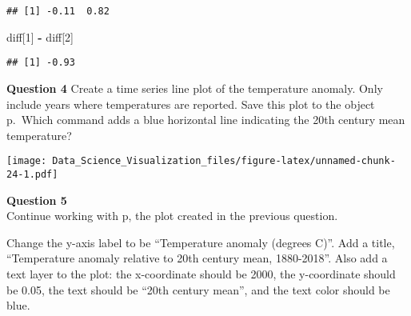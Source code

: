 \documentclass[]{article}
\newenvironment{Shaded}{\begin{snugshade}}{\end{snugshade}}
\newcommand{\DataTypeTok}[1]{\textcolor[rgb]{0.13,0.29,0.53}{#1}}
\newcommand{\DecValTok}[1]{\textcolor[rgb]{0.00,0.00,0.81}{#1}}
\newcommand{\KeywordTok}[1]{\textcolor[rgb]{0.13,0.29,0.53}{\textbf{#1}}}
\newcommand{\NormalTok}[1]{#1}
\newcommand{\OperatorTok}[1]{\textcolor[rgb]{0.81,0.36,0.00}{\textbf{#1}}}
\newcommand{\StringTok}[1]{\textcolor[rgb]{0.31,0.60,0.02}{#1}}
\begin{document}
\begin{verbatim}
## [1] -0.11  0.82
\end{verbatim}

\begin{Shaded}
\begin{Highlighting}[]
\NormalTok{diff[}\DecValTok{1}\NormalTok{] }\OperatorTok{-}\StringTok{ }\NormalTok{diff[}\DecValTok{2}\NormalTok{]}
\end{Highlighting}
\end{Shaded}

\begin{verbatim}
## [1] -0.93
\end{verbatim}

\textbf{Question 4} Create a time series line plot of the temperature
anomaly. Only include years where temperatures are reported. Save this
plot to the object\\
p.~Which command adds a blue horizontal line indicating the 20th century
mean temperature?

\begin{Shaded}
\end{Shaded}

\texttt{[image: Data\_Science\_Visualization\_files/figure-latex/unnamed-chunk-24-1.pdf]}

\textbf{Question 5}\\
Continue working with p, the plot created in the previous question.

Change the y-axis label to be ``Temperature anomaly (degrees C)''. Add a
title, ``Temperature anomaly relative to 20th century mean, 1880-2018''.
Also add a text layer to the plot: the x-coordinate should be 2000, the
y-coordinate should be 0.05, the text should be ``20th century mean'',
and the text color should be blue.
\end{document}
